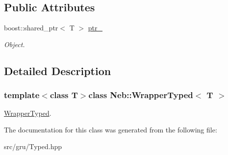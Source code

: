 \subsection*{\-Public \-Attributes}
\begin{DoxyCompactItemize}
\item 
\hypertarget{classNeb_1_1WrapperTyped_ad79780ddfc2aff2a9c3cd0f08456dd89}{boost\-::shared\-\_\-ptr$<$ \-T $>$ \hyperlink{classNeb_1_1WrapperTyped_ad79780ddfc2aff2a9c3cd0f08456dd89}{ptr\-\_\-}}\label{classNeb_1_1WrapperTyped_ad79780ddfc2aff2a9c3cd0f08456dd89}

\begin{DoxyCompactList}\small\item\em \-Object. \end{DoxyCompactList}\end{DoxyCompactItemize}


\subsection{\-Detailed \-Description}
\subsubsection*{template$<$class \-T$>$class Neb\-::\-Wrapper\-Typed$<$ T $>$}

\hyperlink{classNeb_1_1WrapperTyped}{\-Wrapper\-Typed}. 

\-The documentation for this class was generated from the following file\-:\begin{DoxyCompactItemize}
\item 
src/gru/\-Typed.\-hpp\end{DoxyCompactItemize}

